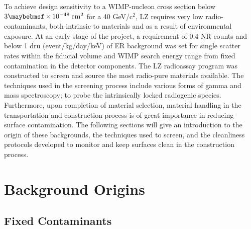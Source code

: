 To achieve design sensitivity to a WIMP-nucleon cross section below $ 3 \times 10^{-48} \; \MathText{cm}^{2}$ for a 40 GeV/c$^2$, LZ requires very low radio-contaminants, both intrinsic to materials and as a result of environmental exposure. At an early stage of the project, a requirement of 0.4 NR counts and below 1 \micro{}dru (event/kg/day/keV) of ER background was set for single scatter rates within the fiducial volume and WIMP search energy range from fixed contamination in the detector components. The LZ radioassay program was constructed to screen and source the most radio-pure materials available. The techniques used in the screening process include various forms of gamma and mass spectroscopy; to probe the intrinsically locked radiogenic species. Furthermore, upon completion of material selection, material handling in the transportation and construction process is of great importance in reducing surface contamination. The following sections will give an introduction to the origin of these backgrounds, the techniques used to screen, and the cleanliness protocols developed to monitor and keep surfaces clean in the construction process. 

\section{Background Origins}
\label{sec:background_origins}

\subsection{Fixed Contaminants}
\label{subsec:fixed_contaminants}

